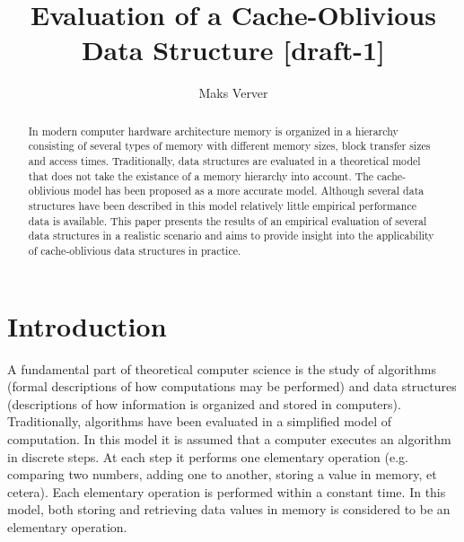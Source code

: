 \documentclass{acm_proc_article-sp}
\begin{document}
\title{Evaluation of a Cache-Oblivious Data Structure [draft-1]}

\author{Maks Verver\\ }


\maketitle

\begin{abstract}
In modern computer hardware architecture memory is organized in a hierarchy
consisting of several types of memory with different memory sizes, block
transfer sizes and access times.
Traditionally, data structures are evaluated in a theoretical model that
does not take the existance of a memory hierarchy into account. The
cache-oblivious model has been proposed as a more accurate model.
Although several data structures have been described in this model
relatively little empirical performance data is available.
This paper presents the results of an empirical evaluation of several data
structures in a realistic scenario and aims to provide insight into
the applicability of cache-oblivious data structures in practice.
\end{abstract}


\section{Introduction}
A fundamental part of theoretical computer science is the study of algorithms (formal descriptions of how computations may be performed) and data structures (descriptions of how information is organized and stored in computers). Traditionally, algorithms have been evaluated in a simplified model of computation. In this model it is assumed that a computer executes an algorithm in discrete steps. At each step it performs one elementary operation (e.g. comparing two numbers, adding one to another, storing a value in memory, et cetera). Each elementary operation is performed within a constant time. In this model, both storing and retrieving data values in memory is considered to be an elementary operation.
\end{document}
